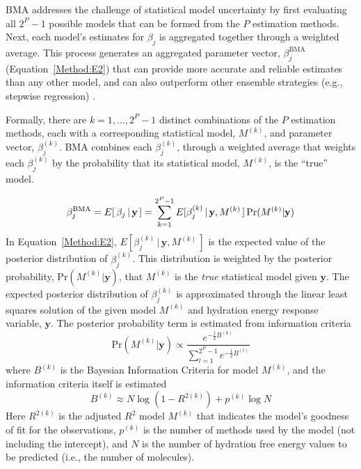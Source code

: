 \documentclass[12pt]{article}
\newcommand{\LG}[1]{\textcolor{black}{#1}}
\newcommand{\+}[1]{\ensuremath{\mathbf{#1}}}
\renewcommand{\vec}[1]{{\mathbf{#1}}}
\begin{document}
BMA addresses the challenge of statistical model uncertainty by first evaluating all $2^{P}-1$ possible models that can be formed from the $P$ estimation methods. Next, each model's estimates for $\beta_j$ is aggregated together through a weighted average. This process generates an aggregated parameter vector, $\beta_j^{\text{BMA}}$ (Equation~\ref{Method:E2}) that can provide more accurate and reliable estimates than any other model, and can also outperform other ensemble strategies (e.g., stepwise regression) \cite{Davidson:2006,Hoeting:1999,Wang:2004,Genell:2010}.

Formally, there are $k = 1, \ldots, 2^P-1$ distinct combinations of the $P$ estimation methods, each with a corresponding statistical model, $M^{(k)}$, and parameter vector, $\beta^{(k)}_j$.  BMA combines each $\beta_{j}^{(k)}$, through a weighted average that weights each $\beta^{(k)}_j$ by the probability that its statistical model, $M^{(k)}$, is the ``true'' model.

\begin{equation}
	\label{Method:E2}
	\LG{\beta_j^{\text{BMA}} = E[\,\beta_j \,|\, \+y\,]  = \sum_{k=1}^{2^P-1} E[\beta_{j}^{(k)}\,|\, \+y,M^{(k)}\,] \, {\mathrm{Pr}}(M^{(k)} | \+y)}
      \end{equation}
      In Equation~\ref{Method:E2}, $E[\beta_{j}^{(k)}\,|\, \+y,M^{(k)}\,]$ is the expected value of the posterior distribution of $\beta^{(k)}_j$. This distribution is weighted by the posterior probability, ${\mathrm{Pr}}(M^{(k)} | \+y)$, that $M^{(k)}$ is the \emph{true} statistical model given $\textbf{y}$. The expected posterior distribution of $\beta^{(k)}_j$ is approximated through the linear least squares solution of the given model $M^{(k)}$ and hydration energy response variable, $\vec{y}$. The posterior probability term is estimated from information criteria~\cite{Raftery:1995}
      \begin{equation}
	\label{Method:E3}
        {\mathrm{Pr}}(M^{(k)} | \+y) \propto
        \frac{e^{-\frac{1}{2}B^{(k)}}}{\sum^{2^P-1}_{l=1} e^{-\frac{1}{2}B^{(l)}}}
      \end{equation}
      where $B^{(k)}$ is the Bayesian Information Criteria for model $M^{(k)}$, and the information criteria itself is estimated~\cite{Raftery:1995}
      \begin{equation}
	\label{Method:E4}
        B^{(k)} \approx N \log{(1-R^{2(k)})} + p^{(k)} \log{N}
\end{equation}
Here  $R^{2(k)}$ is the adjusted $R^2$ model $M^{(k)}$ that indicates the model's goodness of fit for the observations, $p^{(k)}$ is the number of methods used by the model (not including the intercept), and $N$ is the number of hydration free energy values to be predicted (i.e., the number of molecules). 
\end{document}
